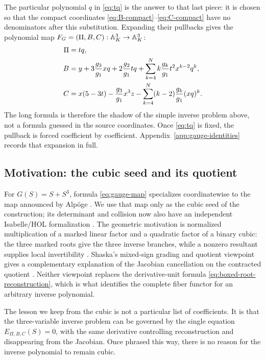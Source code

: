 The particular polynomial \(q\) in \eqref{eq:tq} is the answer to that last
piece: it is chosen so that the
compact coordinates \eqref{eq:B-compact}--\eqref{eq:C-compact} have no
denominators after this substitution.  Expanding their pullbacks gives the
polynomial map \(F_G=(\Pi,B,C):\mathbb A^3_K\to\mathbb A^3_K\):
\begin{align}
 \Pi={}&tq,\notag\\
 B={}&y+3\frac{g_3}{g_1}xq+2\frac{g_2}{g_1}tq
       +\sum_{k=4}^N k\frac{g_k}{g_1}
          t^2x^{k-2}q^k,\notag\\
 C={}&x(5-3t)-\frac{g_3}{g_1}x^3z
       -\sum_{k=4}^N(k-2)\frac{g_k}{g_1}(xq)^k.
 \label{eq:gauge-map}
\end{align}
The long formula is therefore the shadow of the simple inverse problem
above, not a formula guessed in the source coordinates.  Once
\eqref{eq:tq} is fixed, the pullback is forced coefficient by coefficient.
Appendix~\ref{app:gauge-identities} records that expansion in full.

\subsection{Motivation: the cubic seed and its quotient}

For \(G(S)=S+S^3\), formula \eqref{eq:gauge-map} specializes coordinatewise
to the map announced by Alp\"oge \cite{Alpoge}.  We use that map only as the
cubic seed of the construction; its determinant and collision now also have
an independent Isabelle/HOL formalization \cite{IsabelleAFP}.  The geometric
motivation is normalized multiplication of a marked linear factor and a
quadratic factor of a binary cubic: the three marked roots give the three
inverse branches, while a nonzero resultant supplies local invertibility
\cite{TaoDigest}.  Shaska's mixed-sign grading and quotient viewpoint gives
a complementary explanation of the Jacobian cancellation on the contracted
quotient \cite{Shaska}.  Neither viewpoint replaces the derivative-unit
formula \eqref{eq:boxed-root-reconstruction}, which is what identifies the
complete fiber functor for an arbitrary inverse polynomial.

The lesson we keep from the cubic is not a particular list of coefficients.
It is that the three-variable inverse problem can be governed by the single
equation \(E_{\Pi,B,C}(S)=0\), with the same derivative controlling
reconstruction and disappearing from the Jacobian.  Once phrased this way,
there is no reason for the inverse polynomial to remain cubic.

